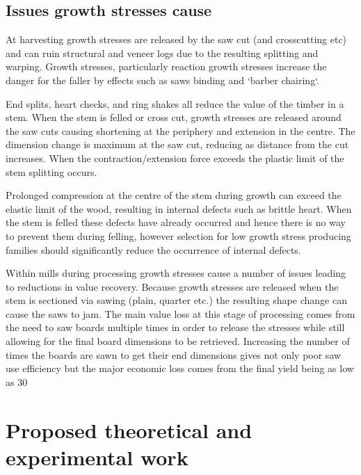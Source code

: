 \documentclass{article}
\begin{document}
\subsection{Issues growth stresses cause }

At harvesting growth stresses are released by the saw cut (and crosscutting etc)
and can ruin structural and veneer logs due to the resulting splitting and
warping. Growth stresses, particularly reaction growth stresses increase the
danger for the faller by effects such as saws binding and `barber chairing`.

End splits, heart checks, and ring shakes all reduce the value of the timber in
a stem. When the stem is felled or cross cut, growth stresses are released
around the saw cuts causing shortening at the periphery and extension in the
centre. The dimension change is maximum at the saw cut, reducing as distance
from the cut increases. When the contraction/extension force exceeds the plastic
limit of the stem splitting occurs.

Prolonged compression at the centre of the stem during growth can exceed the
elastic limit of the wood, resulting in internal defects such as brittle heart.
When the stem is felled these defects have already occurred and hence there is
no way to prevent them during felling, however selection for low growth stress
producing families should significantly reduce the occurrence of internal
defects.

Within mills during processing growth stresses cause a number of issues leading
to reductions in value recovery. Because growth stresses are released when the
stem is sectioned via sawing (plain, quarter etc.) the resulting shape change
can cause the saws to jam. The main value loss at this stage of processing comes
from the need to saw boards multiple times in order to release the stresses
while still allowing for the final board dimensions to be retrieved.
Increasing the number of times the boards are sawn to get their end dimensions
gives not only poor saw use efficiency but the major economic loss comes from the
final yield being as low as 30%


\section{Proposed theoretical and experimental work}
\end{document}
